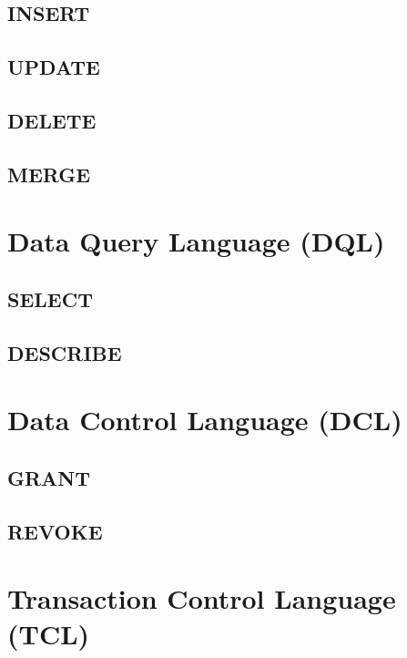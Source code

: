 \documentclass[14pt,fleqn]{extbook} %
\begin{document}
\subsection{INSERT}

\subsection{UPDATE}

\subsection{DELETE}

\subsection{MERGE}

\section{Data Query Language (DQL)}

\subsection{SELECT}

\subsection{DESCRIBE}

\section{Data Control Language (DCL)}

\subsection{GRANT}

\subsection{REVOKE}

%
\section{Transaction Control Language (TCL)}

\end{document}
